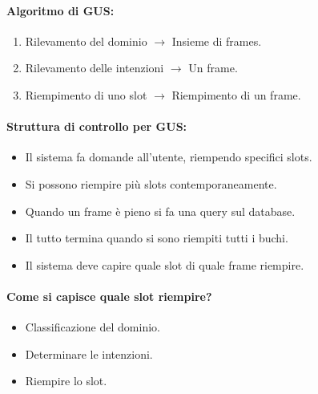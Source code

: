 
\paragraph{Algoritmo di GUS:}

\begin{enumerate}
  \item Rilevamento del dominio $\rightarrow$ Insieme di frames. 
  \item Rilevamento delle intenzioni $\rightarrow$ Un frame.
  \item Riempimento di uno slot $\rightarrow$ Riempimento di un frame.
\end{enumerate}



\paragraph{Struttura di controllo per GUS:}

\begin{itemize}
  \item Il sistema fa domande all'utente, riempendo specifici slots.
  \item Si possono riempire più slots contemporaneamente. 
  \item Quando un frame è pieno si fa una query sul database.
  \item Il tutto termina quando si sono riempiti tutti i buchi.
  \item Il sistema deve capire quale slot di quale frame riempire. 
\end{itemize}

\paragraph{Come si capisce quale slot riempire?}

\begin{itemize}
  \item Classificazione del dominio. 
  \item Determinare le intenzioni. 
  \item Riempire lo slot.
\end{itemize}

